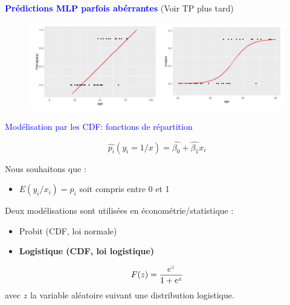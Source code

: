\documentclass[12pt,aspectratio=1610]{beamer}
\begin{document}
\begin{frame}{}
	
	\textcolor{blue}{\textbf{\large Prédictions MLP parfois abérrantes}}
	(Voir TP plus tard)
	\begin{figure}
		\includegraphics[scale=0.52]{lin_logistic.JPG}
		
		\label{}
	\end{figure}
\end{frame}




\begin{frame}
	
	\textcolor{blue}{\large Modélisation par les CDF: fonctions de répartition}
	\vspace{0.5cm}
	
	$$\hat{p_i}(y_i=1/x)=\hat{\beta_0}+\hat{\beta_1}x_i$$
	
	Nous souhaitons que  : 
	\begin{itemize}
		\item $E(y_i/x_i)=p_i$ soit compris entre 0 et 1
	\end{itemize}
	
	Deux modélisations sont utilisées en économétrie/statistique  : 
	\begin{itemize}
		
		\item Probit (CDF, loi normale)
		\item \textbf{Logistique (CDF, loi logistique)}
		
	\end{itemize}
	
	\begin{equation*}
	\large 	F(z)=\frac{e^{z}}{1+e^{z}}
	\end{equation*}
		avec $z$ la variable aléatoire suivant une distribution logistique.
\end{frame}
\end{document}
